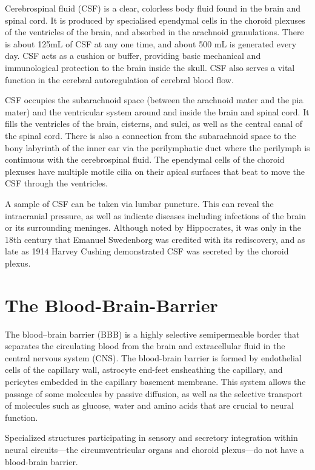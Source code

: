 Cerebrospinal fluid (CSF) is a clear, colorless body fluid found in the brain and spinal cord. It is produced by specialised ependymal cells in the choroid plexuses of the ventricles of the brain, and absorbed in the arachnoid granulations. There is about 125mL of CSF at any one time, and about 500 mL is generated every day. CSF acts as a cushion or buffer, providing basic mechanical and immunological protection to the brain inside the skull. CSF also serves a vital function in the cerebral autoregulation of cerebral blood flow.

CSF occupies the subarachnoid space (between the arachnoid mater and the pia mater) and the ventricular system around and inside the brain and spinal cord. It fills the ventricles of the brain, cisterns, and sulci, as well as the central canal of the spinal cord. There is also a connection from the subarachnoid space to the bony labyrinth of the inner ear via the perilymphatic duct where the perilymph is continuous with the cerebrospinal fluid. The ependymal cells of the choroid plexuses have multiple motile cilia on their apical surfaces that beat to move the CSF through the ventricles.

A sample of CSF can be taken via lumbar puncture. This can reveal the intracranial pressure, as well as indicate diseases including infections of the brain or its surrounding meninges. Although noted by Hippocrates, it was only in the 18th century that Emanuel Swedenborg was credited with its rediscovery, and as late as 1914 Harvey Cushing demonstrated CSF was secreted by the choroid plexus.

\hypertarget{the-blood-brain-barrier}{%
\section{The Blood-Brain-Barrier}\label{the-blood-brain-barrier}}

The blood--brain barrier (BBB) is a highly selective semipermeable border that separates the circulating blood from the brain and extracellular fluid in the central nervous system (CNS). The blood-brain barrier is formed by endothelial cells of the capillary wall, astrocyte end-feet ensheathing the capillary, and pericytes embedded in the capillary basement membrane. This system allows the passage of some molecules by passive diffusion, as well as the selective transport of molecules such as glucose, water and amino acids that are crucial to neural function.

Specialized structures participating in sensory and secretory integration within neural circuits---the circumventricular organs and choroid plexus---do not have a blood-brain barrier.

